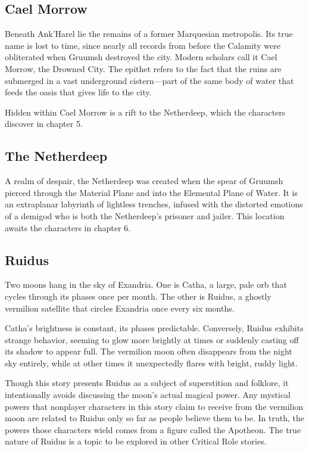 \documentclass[10pt,a4paper,twoside,bg=print,twocolumn,openany,nodeprecatedcode]{dndbook}
\begin{document}
\subsection{Cael Morrow}
Beneath Ank'Harel lie the remains of a former Marquesian metropolis. Its true name is lost to time, since nearly all records from before the Calamity were obliterated when Gruumsh destroyed the city. Modern scholars call it Cael Morrow, the Drowned City. The epithet refers to the fact that the ruins are submerged in a vast underground cistern—part of the same body of water that feeds the oasis that gives life to the city.

Hidden within Cael Morrow is a rift to the Netherdeep, which the characters discover in chapter 5.

\subsection{The Netherdeep}
A realm of despair, the Netherdeep was created when the spear of Gruumsh pierced through the Material Plane and into the Elemental Plane of Water. It is an extraplanar labyrinth of lightless trenches, infused with the distorted emotions of a demigod who is both the Netherdeep's prisoner and jailer. This location awaits the characters in chapter 6.



\subsection{Ruidus}
Two moons hang in the sky of Exandria. One is Catha, a large, pale orb that cycles through its phases once per month. The other is Ruidus, a ghostly vermilion satellite that circles Exandria once every six months.

Catha's brightness is constant, its phases predictable. Conversely, Ruidus exhibits strange behavior, seeming to glow more brightly at times or suddenly casting off its shadow to appear full. The vermilion moon often disappears from the night sky entirely, while at other times it unexpectedly flares with bright, ruddy light.

Though this story presents Ruidus as a subject of superstition and folklore, it intentionally avoids discussing the moon's actual magical power. Any mystical powers that nonplayer characters in this story claim to receive from the vermilion moon are related to Ruidus only so far as people believe them to be. In truth, the powers those characters wield comes from a figure called the Apotheon. The true nature of Ruidus is a topic to be explored in other Critical Role stories.
\end{document}
